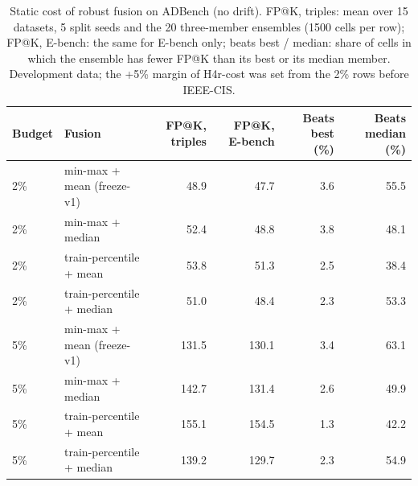 \begin{table}[t]
\centering
\footnotesize
\setlength{\tabcolsep}{3pt}
\caption{Static cost of robust fusion on ADBench (no drift). FP@K, triples: mean over 15 datasets, 5 split seeds and the 20 three-member ensembles (1500 cells per row); FP@K, E-bench: the same for E-bench only; beats best / median: share of cells in which the ensemble has fewer FP@K than its best or its median member. Development data; the +5\% margin of H4r-cost was set from the 2\% rows before IEEE-CIS.}
\label{tab:adbench-static}
\begin{tabular}{l>{\raggedright\arraybackslash}p{3.3cm}rrrr}
\toprule
Budget & Fusion & FP@K, triples & FP@K, E-bench & Beats best (\%) & Beats median (\%) \\
\midrule
2\% & min-max + mean (freeze-v1) & 48.9 & 47.7 & 3.6 & 55.5 \\
2\% & min-max + median & 52.4 & 48.8 & 3.8 & 48.1 \\
2\% & train-percentile + mean & 53.8 & 51.3 & 2.5 & 38.4 \\
2\% & train-percentile + median & 51.0 & 48.4 & 2.3 & 53.3 \\
5\% & min-max + mean (freeze-v1) & 131.5 & 130.1 & 3.4 & 63.1 \\
5\% & min-max + median & 142.7 & 131.4 & 2.6 & 49.9 \\
5\% & train-percentile + mean & 155.1 & 154.5 & 1.3 & 42.2 \\
5\% & train-percentile + median & 139.2 & 129.7 & 2.3 & 54.9 \\
\bottomrule
\end{tabular}
\end{table}
